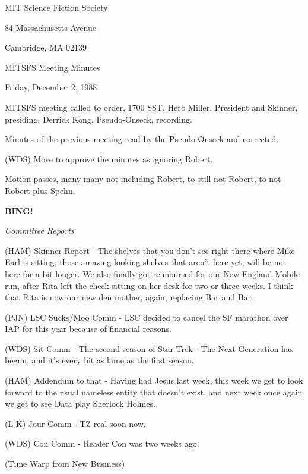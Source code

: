 \documentclass[12pt]{article}
\newcommand{\bing}{{\bf BING!} }
\newcommand{\goto}[1]{\bing \vskip 12pt \centerline{{\em{#1}}}}
\begin{document}
\begin{center}

MIT Science Fiction Society 

84 Massachusetts Avenue

Cambridge, MA 02139

\vspace{12pt}

MITSFS Meeting Minutes 

Friday, December 2, 1988

\end{center}
 
\vspace{18pt}

\setlength{\parskip}{6pt}

\noindent
MITSFS meeting called to order, 1700 SST, Herb Miller, President and Skinner, presiding. Derrick Kong, Pseudo-Onseck, recording.

Minutes of the previous meeting read by the Pseudo-Onseck and corrected.

(WDS) Move to approve the minutes as ignoring Robert.

Motion passes, many many not including Robert, to still not Robert, to not Robert plus Spehn.

\goto{Committee Reports}

(HAM) Skinner Report - The shelves that you don't see right there where Mike Earl is sitting, those amazing looking shelves that aren't here yet, will be not here for a bit longer. We also finally got reimbursed for our New England Mobile run, after Rita left the check sitting on her desk for two or three weeks. I think that Rita is now our new den mother, again, replacing Bar and Bar.

(PJN) LSC Sucks/Moo Comm - LSC decided to cancel the SF marathon over IAP for this year because of financial reasons.

(WDS) Sit Comm - The second season of Star Trek - The Next Generation has begun, and it's every bit as lame as the first season.

(HAM) Addendum to that - Having had Jesus last week, this week we get to look forward to the usual nameless entity that doesn't exist, and next week once again we get to see Data play Sherlock Holmes.

(L K) Jour Comm - TZ real soon now.

(WDS) Con Comm - Reader Con was two weeks ago.

(Time Warp from New Business)
\end{document}
